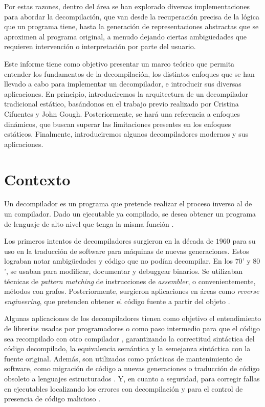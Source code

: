 \documentclass[runningheads]{llncs}
\begin{document}
Por estas razones, dentro del área se han explorado diversas implementaciones para abordar la decompilación, 
que van desde la recuperación precisa de la lógica que un programa tiene, hasta la generación de 
representaciones abstractas que se aproximen al programa original, a menudo dejando ciertas ambigüedades 
que requieren intervención o interpretación por parte del usuario.

Este informe tiene como objetivo presentar un marco teórico que permita entender los fundamentos de la 
decompilación, los distintos enfoques que se han llevado a cabo para implementar un decompilador, e 
introducir sus diversas aplicaciones. En principio, introduciremos la arquitectura de un decompilador 
tradicional estático, basándonos en el trabajo previo realizado por Cristina Cifuentes y John Gough.
Posteriormente, se hará una referencia a enfoques dinámicos, que buscan superar las limitaciones 
presentes en los enfoques estáticos. Finalmente, introduciremos algunos decompiladores modernos 
y sus aplicaciones.

%
\section{Contexto}
Un decompilador es un programa que pretende realizar el proceso inverso al de un compilador. 
Dado un ejecutable ya compilado, se desea obtener un programa de lenguaje de alto nivel que tenga 
la misma función \cite{cifuentes-dcc}.

Los primeros intentos de decompiladores surgieron en la década de $1960$ para su uso en la traducción 
de software para máquinas de nuevas generaciones. Estos lograban notar ambigüedades y código que no 
podían decompilar. En los $70$’ y $80$’, se usaban para modificar, documentar y debuggear binarios. 
Se utilizaban técnicas de \textit{pattern matching} de instrucciones de \textit{assembler}, o 
convenientemente, métodos con grafos. Posteriormente, surgieron aplicaciones en áreas como 
\textit{reverse engineering}, que pretenden obtener el código fuente a partir del objeto \cite{decompilation-methodology}.

Algunas aplicaciones de los decompiladores tienen como objetivo el entendimiento de librerías usadas 
por programadores o como paso intermedio para que el código sea recompilado con otro compilador \cite{meta-decompilation}, 
garantizando la correctitud sintáctica del código decompilado, la equivalencia semántica y la semejanza 
sintáctica con la fuente original. Además, son utilizados como prácticas de mantenimiento de software,
como migración de código a nuevas generaciones o traducción de código obsoleto a lenguajes estructurados \cite{cifuentes-dcc}.
Y, en cuanto a seguridad, para corregir fallas en ejecutables localizando los errores con decompilación \cite{decompilation-correctness}
y para el control de presencia de código malicioso \cite{cifuentes-dcc}.
\end{document}
